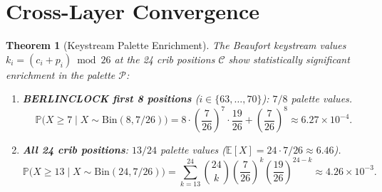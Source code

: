 \documentclass[11pt]{article}
\theoremstyle{plain}
\newtheorem{theorem}{Theorem}[section]
\theoremstyle{definition}
\theoremstyle{remark}
\newcommand{\Prob}{\mathbb{P}}
\newcommand{\E}{\mathbb{E}}
\newcommand{\Bin}{\mathrm{Bin}}
\newcommand{\palette}{\mathcal{P}}
\begin{document}
\section{Cross-Layer Convergence}
\label{sec:cross-layer}

\begin{theorem}[Keystream Palette Enrichment]
\label{thm:keystream}
The Beaufort keystream values $k_i = (c_i + p_i) \bmod 26$ at the 24 crib positions $\mathcal{C}$ show statistically significant enrichment in the palette $\palette$:
\begin{enumerate}\item \textbf{BERLINCLOCK first 8 positions} ($i \in \{63,\ldots,70\}$): $7/8$ palette values.
\[
\Prob\bigl(X \geq 7 \mid X \sim \Bin(8, 7/26)\bigr) = 8 \cdot \left(\frac{7}{26}\right)^7 \cdot \frac{19}{26} + \left(\frac{7}{26}\right)^8 \approx 6.27 \times 10^{-4}.
\]

\item \textbf{All 24 crib positions}: $13/24$ palette values ($\E[X] = 24 \cdot 7/26 \approx 6.46$).
\[
\Prob\bigl(X \geq 13 \mid X \sim \Bin(24, 7/26)\bigr) = \sum_{k=13}^{24} \binom{24}{k} \left(\frac{7}{26}\right)^k \left(\frac{19}{26}\right)^{24-k} \approx 4.26 \times 10^{-3}.
\]
\end{enumerate}
\end{theorem}
\end{document}
